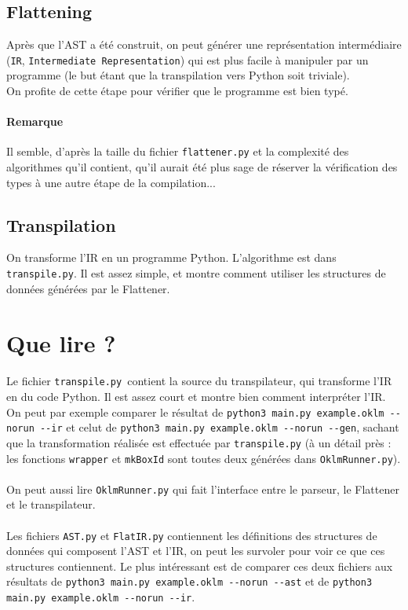 \documentclass[french]{article}
\begin{document}
\subsection{Flattening}

Après que l'AST a été construit, on peut générer une représentation
intermédiaire (\verb|IR|, \verb|Intermediate Representation|) qui est plus facile
à manipuler par un programme (le but étant que la transpilation vers
Python soit triviale). \\
On profite de cette étape pour vérifier que le programme est bien typé. \\
\paragraph{Remarque} Il semble, d'après la taille du fichier \verb|flattener.py| et la
complexité des algorithmes qu'il contient, qu'il aurait été plus sage de
réserver la vérification des types à une autre étape de la compilation...

\subsection{Transpilation}

On transforme l'IR en un programme Python. L'algorithme est dans
\verb|transpile.py|. Il est assez simple, et montre comment utiliser les
structures de données générées par le Flattener.

\section{Que lire ?}

\paragraph{} Le fichier \verb|transpile.py| contient la source du
transpilateur, qui transforme l'IR en du code Python. Il est assez
court et montre bien comment interpréter l'IR. \\
On peut par exemple comparer le résultat de
\verb|python3 main.py example.oklm --norun --ir|
et celut de \verb|python3 main.py example.oklm --norun --gen|,
sachant que la transformation réalisée est effectuée par
\verb|transpile.py| (à un détail près : les fonctions \verb|wrapper|
et \verb|mkBoxId| sont toutes deux générées dans \verb|OklmRunner.py|).

\paragraph{} On peut aussi lire \verb|OklmRunner.py| qui fait l'interface
entre le parseur, le Flattener et le transpilateur.

\paragraph{} Les fichiers \verb|AST.py| et \verb|FlatIR.py| contiennent
les définitions des structures de données qui composent l'AST et l'IR,
on peut les survoler pour voir ce que ces structures contiennent. Le
plus intéressant est de comparer ces deux fichiers aux résultats de
\verb|python3 main.py example.oklm --norun --ast| et de
\verb|python3 main.py example.oklm --norun --ir|.
\end{document}
